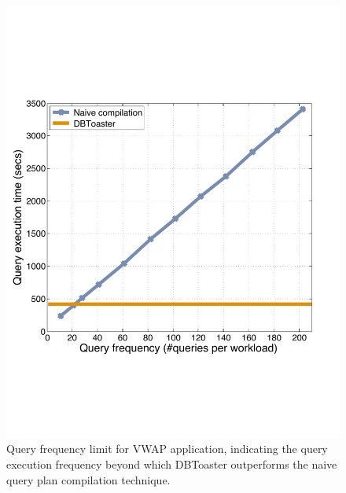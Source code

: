 \begin{figure}[htbp]
\begin{center}
\includegraphics[scale=0.25]{../plots/vwap_query_freq_dn}
\end{center}
\caption{Query frequency limit for VWAP application, indicating the
query execution frequency beyond which DBToaster outperforms the naive query
plan compilation technique.}
\label{fig:vwap_query_freq}
\end{figure}

